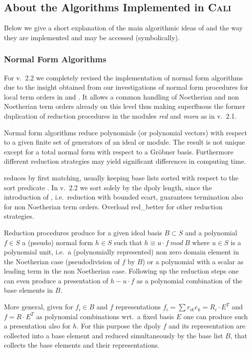 \subsection{About the Algorithms Implemented in \textsc{Cali}}

Below we give a short explanation of the main algorithmic ideas of
 and the way they are implemented and may be accessed
(symbolically).

\subsubsection{Normal Form Algorithms}

For v.~2.2 we completely revised the implementation of normal form
algorithms due to the insight obtained from our investigations of
normal form procedures for local term orders in \cite{Graebe:95a} and
\cite{Graebe:94}. It allows a common handling of Noetherian and non
Noetherian term orders already on this level thus making superfluous
the former duplication of reduction procedures in the modules
\emph{red} and \emph{mora} as in v.~2.1.
\medskip

Normal form algorithms reduce polynomials (or polynomial vectors)
with respect to a given finite set of generators of an ideal or
module. The result is not unique except for a total normal form with
respect to a Gr\"obner basis. Furthermore different reduction strategies
may yield significant differences in computing time.

 reduces by first matching, usually keeping base lists sorted
with respect to the sort predicate . In v.~2.2 we
sort solely by the dpoly length, since the introduction of
, i.e.\ reduction with bounded ecart, guarantees
termination also for non Noetherian term orders. Overload red\_better
for other reduction strategies.
\medskip

Reduction procedures produce for a given ideal basis $B\subset S$ and
a polynomial $f\in S$ a (pseudo) normal form $h\in S$ such that
$h\equiv u\cdot f\ mod\ B$ where $u\in S$ is a polynomial unit, i.e.\
a (polynomially represented) non zero domain element in the Noetherian
case (pseudodivision of $f$ by $B$) or a polynomial with a scalar as
leading term in the non Noetherian case. Following up the reduction
steps one can even produce a presentation of $h-u\cdot f$ as a
polynomial combination of the base elements in $B$.

More general, given for $f_i\in B$ and $f$ representations $f_i =
\sum{r_{ik}e_k} = R_i\cdot E^T$ and $f=R\cdot E^T$ as polynomial
combinations wrt.\ a fixed basis $E$ one can produce such a
presentation also for $h$. For this purpose the dpoly $f$ and its
representation are collected into a base element and reduced
simultaneously by the base list $B$, that collects the base elements
and their representations.
\medskip

